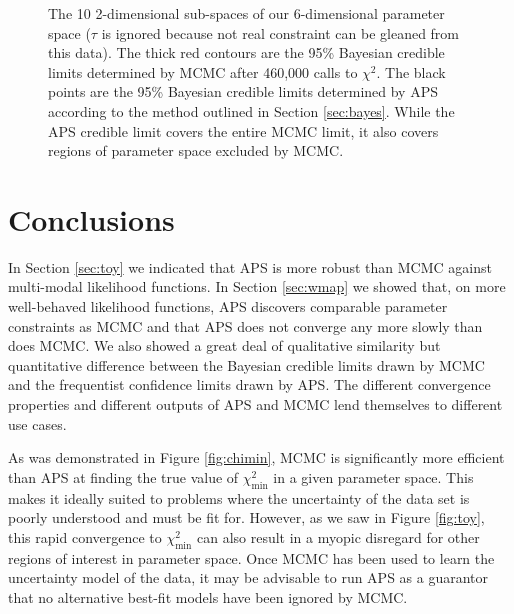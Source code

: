 \documentclass[useAMS,usenatbib]{aastex}
\begin{document}
\begin{figure*}
\caption{
The 10 2-dimensional sub-spaces of our 6-dimensional parameter space
($\tau$ is ignored because not real constraint can be gleaned from this data).
The thick red contours are the 95\% Bayesian credible limits determined by MCMC after
460,000 calls to $\chi^2$.  The black points are the 95\% Bayesian credible limits determined
by APS according to the method outlined in Section \ref{sec:bayes}.  While the APS credible limit
covers the entire MCMC limit, it also covers regions of parameter space excluded by MCMC.
}
\label{fig:contours_bayes}
\end{figure*}

\section{Conclusions}
\label{sec:conclusions}

In Section \ref{sec:toy} we indicated that APS is more robust
than MCMC against multi-modal likelihood functions.
In Section \ref{sec:wmap} we showed that, on more well-behaved
likelihood functions, APS discovers comparable parameter constraints
as MCMC and that APS does not converge any more slowly than does MCMC.
We also showed a great deal of qualitative similarity but quantitative
difference between the Bayesian credible limits drawn by MCMC
and the frequentist confidence limits drawn by APS.  The different
convergence properties and different outputs of APS and MCMC lend themselves
to different use cases.

As was demonstrated in Figure \ref{fig:chimin}, MCMC is significantly
more efficient than APS at finding the true value of $\chi^2_\text{min}$
in a given parameter space.  This makes it ideally suited to problems where
the uncertainty of the data set is poorly understood and must be fit
for.  However, as we saw in Figure \ref{fig:toy}, this rapid convergence to
$\chi^2_\text{min}$ can also result in a myopic disregard for other regions of
interest in parameter space.  Once MCMC has been used to learn the uncertainty
model of the data, it may be advisable to run APS as a guarantor that no
alternative best-fit models have been ignored by MCMC.
\end{document}
